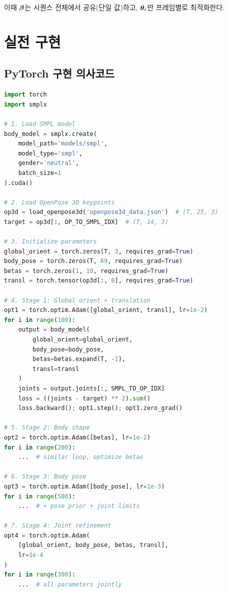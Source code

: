 \documentclass[11pt, a4paper]{report}
\begin{document}
이때 $\bm{\beta}$는 시퀀스 전체에서 공유(단일 값)하고, $\bm{\theta}_t$만 프레임별로 최적화한다.


\chapter{실전 구현}
\label{ch:implementation}

\section{PyTorch 구현 의사코드}

\begin{codebox}[title={OpenPose 3D $\rightarrow$ SMPL 피팅 (PyTorch)}]
\begin{lstlisting}[language=Python]
import torch
import smplx

# 1. Load SMPL model
body_model = smplx.create(
    model_path='models/smpl',
    model_type='smpl',
    gender='neutral',
    batch_size=1
).cuda()

# 2. Load OpenPose 3D keypoints
op3d = load_openpose3d('openpose3d_data.json')  # (T, 25, 3)
target = op3d[:, OP_TO_SMPL_IDX]  # (T, 14, 3)

# 3. Initialize parameters
global_orient = torch.zeros(T, 3, requires_grad=True)
body_pose = torch.zeros(T, 69, requires_grad=True)
betas = torch.zeros(1, 10, requires_grad=True)
transl = torch.tensor(op3d[:, 8], requires_grad=True)

# 4. Stage 1: Global orient + translation
opt1 = torch.optim.Adam([global_orient, transl], lr=1e-2)
for i in range(100):
    output = body_model(
        global_orient=global_orient,
        body_pose=body_pose,
        betas=betas.expand(T, -1),
        transl=transl
    )
    joints = output.joints[:, SMPL_TO_OP_IDX]
    loss = ((joints - target) ** 2).sum()
    loss.backward(); opt1.step(); opt1.zero_grad()

# 5. Stage 2: Body shape
opt2 = torch.optim.Adam([betas], lr=1e-2)
for i in range(200):
    ...  # similar loop, optimize betas

# 6. Stage 3: Body pose
opt3 = torch.optim.Adam([body_pose], lr=1e-3)
for i in range(500):
    ...  # + pose prior + joint limits

# 7. Stage 4: Joint refinement
opt4 = torch.optim.Adam(
    [global_orient, body_pose, betas, transl],
    lr=1e-4
)
for i in range(300):
    ...  # all parameters jointly
\end{lstlisting}
\end{codebox}
\end{document}
